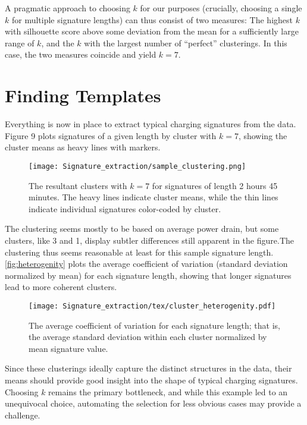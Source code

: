 \documentclass[12pt, american]{report}
\begin{document}
A pragmatic approach to choosing $k$ for our purposes (crucially, choosing a single $k$ for multiple signature lengths) can thus consist of two measures: The highest $k$ with silhouette score above some deviation from the mean for a sufficiently large range of $k$, and the $k$ with the largest number of “perfect” clusterings. In this case, the two measures coincide and yield $k=7$.

\section{Finding Templates}
Everything is now in place to extract typical charging signatures from the data. Figure 9 plots signatures of a given length by cluster with $k=7$, showing the cluster means as heavy lines with markers.

\begin{figure}[h]
\centering
\caption{The resultant clusters with $k=7$ for signatures of length 2 hours 45 minutes. The heavy lines indicate cluster means, while the thin lines indicate individual signatures color-coded by cluster.}
\label{fig:clustering_1}
\texttt{[image: Signature\_extraction/sample\_clustering.png]}
\end{figure}

The clustering seems mostly to be based on average power drain, but some clusters, like 3 and 1, display subtler differences still apparent in the figure.The clustering thus seems reasonable at least for this sample signature length. \autoref{fig:heterogenity} plots the average coefficient of variation (standard deviation normalized by mean) for each signature length, showing that longer signatures lead to more coherent clusters.

\begin{figure}[h]
\centering
\caption{The average coefficient of variation for each signature length; that is, the average standard deviation within each cluster normalized by mean signature value.}
\label{fig:heterogenity}
\texttt{[image: Signature\_extraction/tex/cluster\_heterogenity.pdf]}
\end{figure}

Since these clusterings ideally capture the distinct structures in the data, their means should provide good insight into the shape of typical charging signatures. Choosing $k$ remains the primary bottleneck, and while this example led to an unequivocal choice, automating the selection for less obvious cases may provide a challenge.
\end{document}
